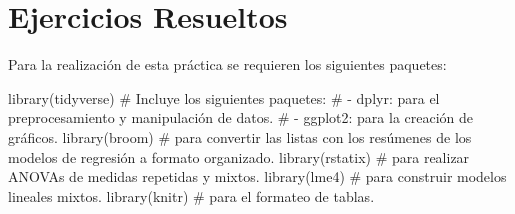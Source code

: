 \documentclass[
  a4paper,
]{scrreport}
\newenvironment{Shaded}{\begin{snugshade}}{\end{snugshade}}
\newcommand{\CommentTok}[1]{\textcolor[rgb]{0.37,0.37,0.37}{#1}}
\newcommand{\FunctionTok}[1]{\textcolor[rgb]{0.28,0.35,0.67}{#1}}
\newcommand{\NormalTok}[1]{\textcolor[rgb]{0.00,0.23,0.31}{#1}}
\theoremstyle{definition}
\theoremstyle{remark}
\begin{document}
\section{Ejercicios Resueltos}\label{ejercicios-resueltos-8}

Para la realización de esta práctica se requieren los siguientes
paquetes:

\begin{Shaded}
\begin{Highlighting}[]
\FunctionTok{library}\NormalTok{(tidyverse)}
\CommentTok{\# Incluye los siguientes paquetes:}
\CommentTok{\# {-} dplyr: para el preprocesamiento y manipulación de datos.}
\CommentTok{\# {-} ggplot2: para la creación de gráficos.}
\FunctionTok{library}\NormalTok{(broom) }\CommentTok{\# para convertir las listas con los resúmenes de los modelos de regresión a formato organizado.}
\FunctionTok{library}\NormalTok{(rstatix) }\CommentTok{\# para realizar ANOVAs de medidas repetidas y mixtos.}
\FunctionTok{library}\NormalTok{(lme4) }\CommentTok{\# para construir modelos lineales mixtos.}
\FunctionTok{library}\NormalTok{(knitr) }\CommentTok{\# para el formateo de tablas.}
\end{Highlighting}
\end{Shaded}
\end{document}
